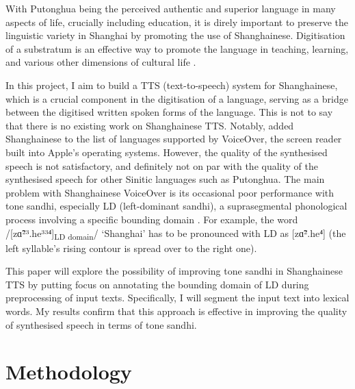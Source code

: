 \documentclass[11pt]{article}
\begin{document}
With Putonghua being the perceived authentic and superior language in many aspects of life, crucially including education, it is direly important to preserve the linguistic variety in Shanghai by promoting the use of Shanghainese.
Digitisation of a substratum is an effective way to promote the language in teaching, learning, and various other dimensions of cultural life \citep{villaIntegratingTechnologyMinority2002}.

In this project, I aim to build a TTS (text-to-speech) system for Shanghainese, which is a crucial component in the digitisation of a language, serving as a bridge between the digitised written spoken forms of the language.
This is not to say that there is no existing work on Shanghainese TTS. Notably, \citet{VoiceOver} added Shanghainese to the list of languages supported by VoiceOver, the screen reader built into Apple's operating systems. However, the quality of the synthesised speech is not satisfactory, and definitely not on par with the quality of the synthesised speech for other Sinitic languages such as Putonghua.
The main problem with Shanghainese Voice\-Over is its occasional poor performance with tone sandhi, especially LD (left-dominant sandhi), a suprasegmental phonological process involving a specific bounding domain \citep{robertsAutosegmentalMetricalModelShanghainese2020}.
For example, the word /[zɑ̃²³.he³³⁴]\textsubscript{LD domain}/ `Shanghai' has to be pronounced with LD as [zɑ̃².he⁴] (the left syllable's rising contour is spread over to the right one).

This paper will explore the possibility of improving tone sandhi in Shanghainese TTS by putting focus on annotating the bounding domain of LD during preprocessing of input texts.
Specifically, I will segment the input text into lexical words. My results confirm that this approach is effective in improving the quality of synthesised speech in terms of tone sandhi.

\section{Methodology}
\end{document}

